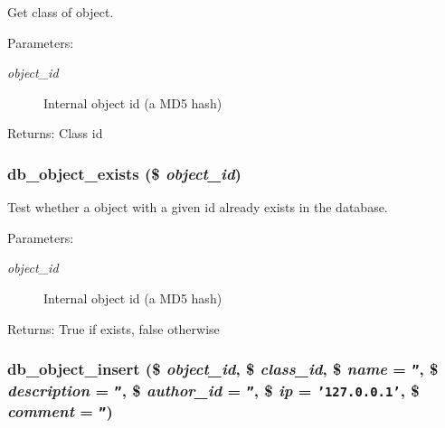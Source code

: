 Get class of object. 

\begin{Desc}
\item[Parameters:]
\begin{description}
\item[{\em object\_\-id}]Internal object id (a MD5 hash)\end{description}
\end{Desc}
\begin{Desc}
\item[Returns:]Class id \end{Desc}
\hypertarget{eav_8php_67d5d7031fc3a5d7cd9bd7ea66959eb2}{
\subsubsection{\setlength{\rightskip}{0pt plus 5cm}db\_\-object\_\-exists (\$ {\em object\_\-id})}}
\label{eav_8php_67d5d7031fc3a5d7cd9bd7ea66959eb2}


Test whether a object with a given id already exists in the database. 

\begin{Desc}
\item[Parameters:]
\begin{description}
\item[{\em object\_\-id}]Internal object id (a MD5 hash)\end{description}
\end{Desc}
\begin{Desc}
\item[Returns:]True if exists, false otherwise \end{Desc}
\hypertarget{eav_8php_d520925b88a5b09159cc582122b40af8}{
\subsubsection{\setlength{\rightskip}{0pt plus 5cm}db\_\-object\_\-insert (\$ {\em object\_\-id}, \/  \$ {\em class\_\-id}, \/  \$ {\em name} = {\tt ''}, \/  \$ {\em description} = {\tt ''}, \/  \$ {\em author\_\-id} = {\tt ''}, \/  \$ {\em ip} = {\tt '127.0.0.1'}, \/  \$ {\em comment} = {\tt ''})}}
\label{eav_8php_d520925b88a5b09159cc582122b40af8}


